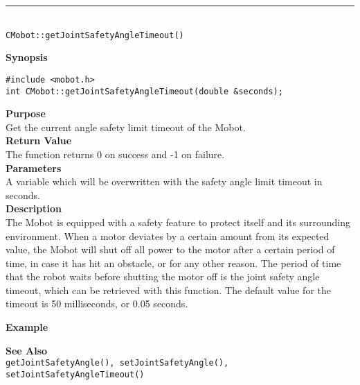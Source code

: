 \noindent
\vspace{5pt}
\rule{4.5in}{0.015in}\\
\noindent
{\LARGE \texttt{CMobot::getJointSafetyAngleTimeout()}}\\
{}

\noindent
{\bf Synopsis}
\vspace{-8pt}
\begin{verbatim}
#include <mobot.h>
int CMobot::getJointSafetyAngleTimeout(double &seconds);
\end{verbatim}

\noindent
{\bf Purpose}\\
Get the current angle safety limit timeout of the Mobot.\\

\noindent
{\bf Return Value}\\
The function returns 0 on success and -1 on failure.\\

\noindent
{\bf Parameters}\\
A variable which will be overwritten with the safety angle limit timeout in seconds.\\

\noindent
{\bf Description}\\
The Mobot is equipped with a safety feature to protect itself and its surrounding
environment. When a motor deviates by a certain amount from its expected value, 
the Mobot will shut off all power to the motor after a certain period of time,
in case it has hit an obstacle, or for any other reason. The period of time that the
robot waits before shutting the motor off is the joint safety angle timeout, which
can be retrieved with this function. The default value for the timeout is 50 milliseconds,
or 0.05 seconds.
 
\noindent
{\bf Example}\\
\noindent

\noindent
{\bf See Also}\\
\texttt{getJointSafetyAngle(), setJointSafetyAngle(), setJointSafetyAngleTimeout()}\\


